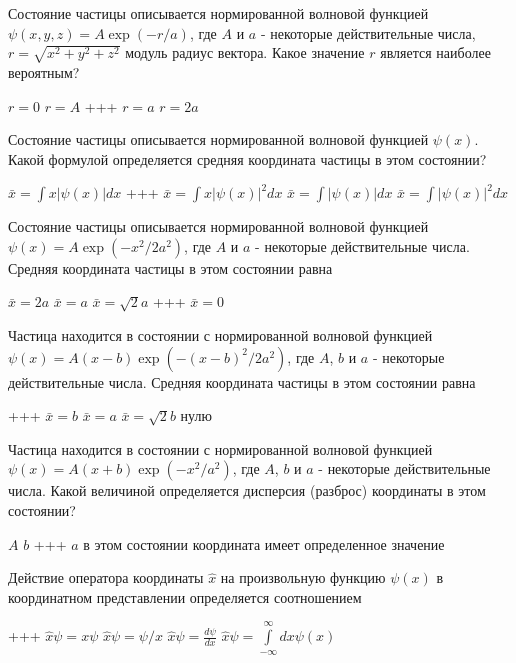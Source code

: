 \documentclass[11pt,a4paper]{exam}
\newcommand{\rightchoice}{\choice +++ }
\begin{document}
\begin{questions}
\question Состояние частицы описывается нормированной волновой функцией $\psi (x,y,z) = A\exp ( - r/a)$, где $A$ и $a$ - некоторые действительные числа, $r = \sqrt {{x^2} + {y^2} + {z^2}} $ модуль радиус вектора. Какое значение $r$ является наиболее вероятным?
\begin{choices}
\choice $r = 0$      
\choice $r = A$      
\rightchoice $r = a$      
\choice $r = 2a$
\end{choices}

\question Состояние частицы описывается нормированной волновой функцией $\psi (x)$. Какой формулой определяется средняя координата частицы в этом состоянии?
\begin{choices}
\choice $\bar x = \int {x|\psi (x)|dx} $     
\rightchoice $\bar x = \int {x|\psi (x){|^2}dx} $    
\choice $\bar x = \int {|\psi (x)|dx} $   
\choice $\bar x = \int {|\psi (x){|^2}dx} $
\end{choices}

\question Состояние частицы описывается нормированной волновой функцией $\psi (x) = A\exp ( - {x^2}/2{a^2})$, где $A$ и $a$ - некоторые действительные числа. Средняя координата частицы в этом состоянии равна
\begin{choices}
\choice $\bar x = 2a$      
\choice $\bar x = a$    
\choice $\bar x = \sqrt 2 a$     
\rightchoice $\bar x = 0$
\end{choices}

\question Частица находится в состоянии с нормированной волновой функцией $\psi (x) = A(x - b)\exp ( - {(x - b)^2}/2{a^2})$, где $A$, $b$ и $a$ - некоторые действительные числа. Средняя координата частицы в этом состоянии равна
\begin{choices}
\rightchoice $\bar x = b$    
\choice $\bar x = a$    
\choice $\bar x = \sqrt 2 b$     
\choice нулю
\end{choices}

\question Частица находится в состоянии с нормированной волновой функцией $\psi (x) = A(x + b)\exp ( - {x^2}/{a^2})$, где $A$, $b$ и $a$ - некоторые действительные числа. Какой величиной определяется дисперсия (разброс) координаты в этом состоянии?
\begin{choices}
\choice $A$       
\choice $b$
\rightchoice $a$       
\choice в этом состоянии координата имеет определенное значение
\end{choices}

\question Действие оператора координаты $\hat x$ на произвольную функцию $\psi (x)$ в координатном представлении определяется соотношением
\begin{choices}
\rightchoice $\hat x\psi  = x\psi $      
\choice $\hat x\psi  = \psi /x$     
\choice $\hat x\psi  = \frac{{d\psi }}{{dx}}$      
\choice $\hat x\psi  = \int\limits_{ - \infty }^\infty  {dx\psi (x)} $
\end{choices}


\end{questions}
\end{document}
